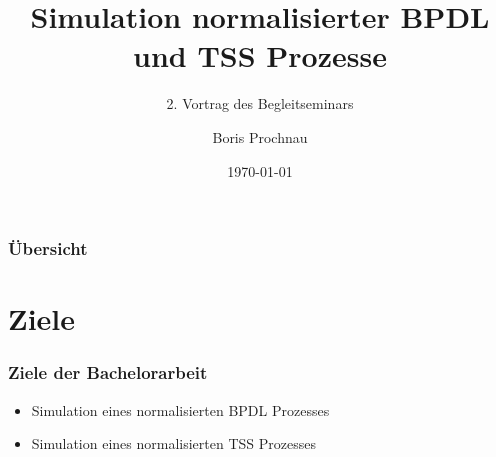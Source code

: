 \documentclass{beamer}
\title[Simulation normalisierter Prozesse] %
{Simulation normalisierter BPDL und TSS Prozesse}
\subtitle{2. Vortrag des Begleitseminars}
\author[B.Prochnau] %
{Boris Prochnau}
\institute[Universität Bonn]{Institut für Angewandte Mathematik\\Universität Bonn}
\date {\today}
\begin{document}
%
%

\begin{frame}
  \titlepage
\end{frame}
\begin{frame}
  \frametitle{Übersicht}
  \tableofcontents
\end{frame}

\section{Ziele}
	\begin{frame}
		\frametitle{Ziele der Bachelorarbeit}
		\begin{itemize}
			\item Simulation eines normalisierten BPDL Prozesses
			\item Simulation eines normalisierten TSS Prozesses
		\end{itemize}
	\end{frame}
\end{document}
